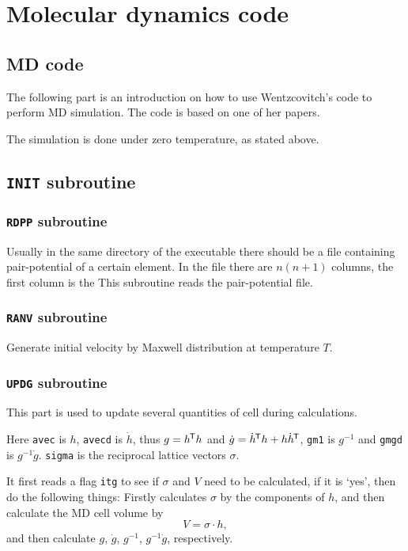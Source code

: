 
\section{Molecular dynamics code}

\subsection{MD code}

The following part is an introduction on how to use
Wentzcovitch's code to perform MD simulation. The code is
based on one of her papers.\cite{Wentzcovitch:1991ka}

The simulation is done under zero temperature, as stated above.


\subsection{\texttt{INIT} subroutine}


\subsubsection{\texttt{RDPP} subroutine}

Usually in the same directory of the executable there should be
a file containing pair-potential of a certain element. In the file there
are $n (n+1)$ columns, the first column is the
This subroutine reads the pair-potential file.


\subsubsection{\texttt{RANV} subroutine}

Generate initial velocity by Maxwell distribution at temperature $T$.


\subsubsection{\texttt{UPDG} subroutine}

This part is used to update several quantities of cell during calculations.

Here \texttt{avec} is $h$, \texttt{avecd} is $\dot{ h }$, thus $g = h^{\mkern-1.5mu\mathsf{T}} h$
and $\dot{g}  = \dot{ h }^{\mkern-1.5mu\mathsf{T}} h + h \dot{ h }^{\mkern-1.5mu\mathsf{T}}$, \texttt{gm1} is $g^{-1}$
and \texttt{gmgd} is $g^{-1} \dot{g}$. \texttt{sigma} is the reciprocal lattice
vectors $\sigma$.

It first reads a flag \texttt{itg} to see if $\sigma$ and $V$ need to be calculated,
if it is `yes', then do the following things:
Firstly calculates $\sigma$ by the components of $h$, and then calculate the
MD cell volume by
\begin{equation}
	V = \sigma \cdot h,
\end{equation}
and then calculate $g$, $\dot{ g }$, $g^{-1}$, $g^{-1}\dot{g}$, respectively.


